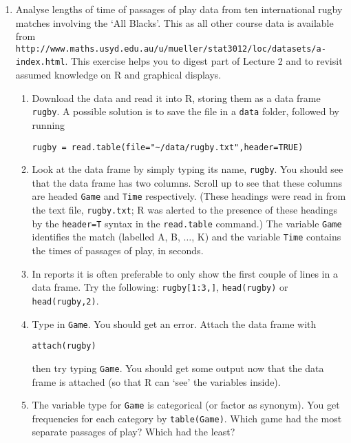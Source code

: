 \documentclass[11pt,a4paper]{article}
\begin{document}
\begin{enumerate}
\item Analyse lengths of time of passages of play data from ten international
rugby matches involving the `All Blacks'. This as all other course data is available from\\ \texttt{http://www.maths.usyd.edu.au/u/mueller/stat3012/loc/datasets/a-index.html}. This exercise helps you to digest part of Lecture 2 and to revisit assumed knowledge on R and graphical displays.

\begin{enumerate}
\item Download the data and read it into R, storing them as a data frame \texttt{rugby}. A possible solution is to save the file in a \texttt{data} folder, followed by running
{\color{mycolr}
\begin{verbatim}
rugby = read.table(file="~/data/rugby.txt",header=TRUE)
\end{verbatim}}


\item Look at the data frame by simply typing its name, \texttt{rugby}. You 
should see that the data frame has two columns. Scroll up to see that these columns are headed \texttt{Game} and \texttt{Time}
respectively. (These headings were read in from the text file, \texttt{rugby.txt};
R was alerted to the presence of these headings by the \texttt{header=T} syntax in
the \texttt{read.table} command.) The variable \texttt{Game} identifies the match 
(labelled A, B, $\ldots$, K) and the variable \texttt{Time} contains the times of 
passages of play, in seconds.

\item In reports it is often preferable to only show the first couple of lines in a data frame. Try the following: \texttt{rugby[1:3,]}, \texttt{head(rugby)} or \texttt{head(rugby,2)}.

\item Type in \texttt{Game}. You should get an error. Attach the data frame with 
\begin{verbatim}
attach(rugby)
\end{verbatim}  
then try typing \texttt{Game}. You should get some output now that the data frame
is attached (so that R can `see' the variables inside).

\item The variable type for \texttt{Game} is categorical (or factor as synonym). You get frequencies for each category by 
\texttt{table(Game)}.
Which game had the most separate passages of play? Which had the least?


\end{enumerate}
\end{enumerate}
\end{document}
